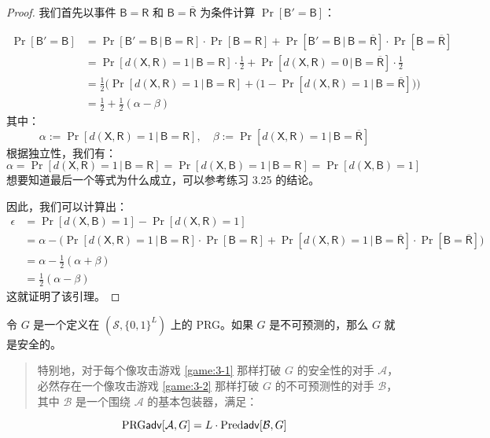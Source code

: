 \begin{proof}
我们首先以事件 $\mathsf{B}=\mathsf{R}$ 和 $\mathsf{B}=\mathsf{\overline R}$ 为条件计算 $\Pr[\mathsf{B}'=\mathsf{B}]$：

$$
\begin{aligned}
\Pr[\mathsf{B}'=\mathsf{B}]
&=\Pr[\mathsf{B}'=\mathsf{B}\,|\,\mathsf{B}=\mathsf{R}]\cdot\Pr[\mathsf{B}=\mathsf{R}]+\Pr[\mathsf{B}'=\mathsf{B}\,|\,\mathsf{B}=\mathsf{\overline R}]\cdot\Pr[\mathsf{B}=\mathsf{\overline R}]\\
&=\Pr[d(\mathsf{X},\mathsf{R})=1\,|\,\mathsf{B}=\mathsf{R}]\cdot\frac{1}{2}+\Pr[d(\mathsf{X},\mathsf{R})=0\,|\,\mathsf{B}=\mathsf{\overline R}]\cdot\frac{1}{2}\\
&=\frac{1}{2}
\Big(\Pr[d(\mathsf{X},\mathsf{R})=1\,|\,\mathsf{B}=\mathsf{R}]+
\big(
1-\Pr[d(\mathsf{X},\mathsf{R})=1\,|\,\mathsf{B}=\mathsf{\overline R}]
\big)
\Big)\\
&=\frac{1}{2}+\frac{1}{2}(\alpha-\beta)
\end{aligned}
$$
其中：
$$
\alpha:=\Pr[d(\mathsf{X},\mathsf{R})=1\,|\,\mathsf{B}=\mathsf{R}],\quad
\beta:=\Pr[d(\mathsf{X},\mathsf{R})=1\,|\,\mathsf{B}=\mathsf{\overline R}]
$$
根据独立性，我们有：
$$
\alpha=\Pr[d(\mathsf{X},\mathsf{R})=1\,|\,\mathsf{B}=\mathsf{R}]=\Pr[d(\mathsf{X},\mathsf{B})=1\,|\,\mathsf{B}=\mathsf{R}]=\Pr[d(\mathsf{X},\mathsf{B})=1]
$$
想要知道最后一个等式为什么成立，可以参考练习 3.25 的结论。

因此，我们可以计算出：
$$
\begin{aligned}
\epsilon
&=\Pr[d(\mathsf{X},\mathsf{B})=1]-\Pr[d(\mathsf{X},\mathsf{R})=1]\\
&=\alpha-
\Big(\Pr[d(\mathsf{X},\mathsf{R})=1\,|\,\mathsf{B}=\mathsf{R}]\cdot\Pr[\mathsf{B}=\mathsf{R}]+\Pr[d(\mathsf{X},\mathsf{R})=1\,|\,\mathsf{B}=\mathsf{\overline R}]\cdot\Pr[\mathsf{B}=\mathsf{\overline R}]
\Big)\\
&=\alpha-\frac{1}{2}(\alpha+\beta)\\
&=\frac{1}{2}(\alpha-\beta)
\end{aligned}
$$
这就证明了该引理。
\end{proof}

\begin{theorem}
令 $G$ 是一个定义在 $(\mathcal{S},\{0,1\}^L)$ 上的 PRG。如果 $G$ 是不可预测的，那么 $G$ 就是安全的。
\begin{quote}
特别地，对于每个像攻击游戏 \ref{game:3-1} 那样打破 $G$ 的安全性的对手 $\mathcal{A}$，必然存在一个像攻击游戏 \ref{game:3-2} 那样打破 $G$ 的不可预测性的对手 $\mathcal{B}$，其中 $\mathcal{B}$ 是一个围绕 $\mathcal{A}$ 的基本包装器，满足：
\end{quote}
$$
{\rm PRG\mathsf{adv}}[\mathcal{A},G]=L\cdot{\rm Pred\mathsf{adv}}[\mathcal{B},G]
$$
\end{theorem}

